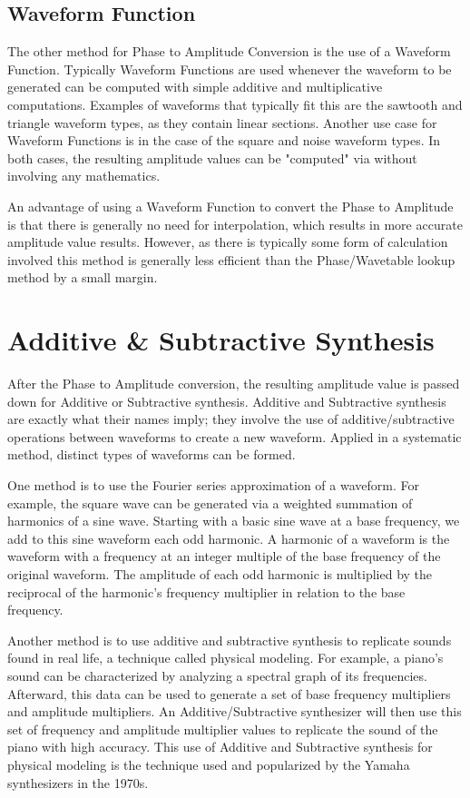 \documentclass[a4paper,12pt]{report}
\begin{document}
\subsection{Waveform Function}
The other method for Phase to Amplitude Conversion is the use of a Waveform Function. Typically Waveform Functions are used whenever the waveform to be generated can be computed with simple additive and multiplicative computations. Examples of waveforms that typically fit this are the sawtooth and triangle waveform types, as they contain linear sections. Another use case for Waveform Functions is in the case of the square and noise waveform types. In both cases, the resulting amplitude values can be "computed" via without involving any mathematics.

An advantage of using a Waveform Function to convert the Phase to Amplitude is that there is generally no need for interpolation, which results in more accurate amplitude value results. However, as there is typically some form of calculation involved this method is generally less efficient than the Phase/Wavetable lookup method by a small margin.

\section{Additive & Subtractive Synthesis}
After the Phase to Amplitude conversion, the resulting amplitude value is passed down for Additive or Subtractive synthesis. Additive and Subtractive synthesis are exactly what their names imply; they involve the use of additive/subtractive operations between waveforms to create a new waveform. Applied in a systematic method, distinct types of waveforms can be formed.

One method is to use the Fourier series approximation of a waveform. For example, the square wave can be generated via a weighted summation of harmonics of a sine wave. Starting with a basic sine wave at a base frequency, we add to this sine waveform each odd harmonic. A harmonic of a waveform is the waveform with a frequency at an integer multiple of the base frequency of the original waveform. The amplitude of each odd harmonic is multiplied by the reciprocal of the harmonic's frequency multiplier in relation to the base frequency.

Another method is to use additive and subtractive synthesis to replicate sounds found in real life, a technique called physical modeling. For example, a piano's sound can be characterized by analyzing a spectral graph of its frequencies. Afterward, this data can be used to generate a set of base frequency multipliers and amplitude multipliers. An Additive/Subtractive synthesizer will then use this set of frequency and amplitude multiplier values to replicate the sound of the piano with high accuracy. This use of Additive and Subtractive synthesis for physical modeling is the technique used and popularized by the Yamaha synthesizers in the 1970s.
\end{document}
